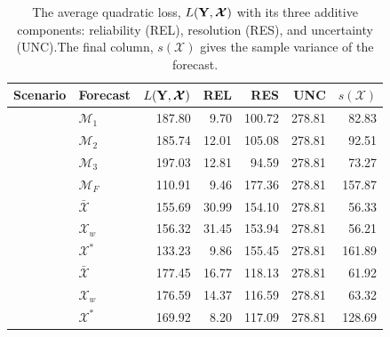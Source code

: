 \documentclass[11pt]{article}
\theoremstyle{definition}
\theoremstyle{definition}
\def\Y{{\bf Y}}
\begin{document}
\begin{table}[h!]
\centering
\caption{The average quadratic loss, $L(\Y,\boldsymbol{\mathcal{X}} )$ with its three additive components: reliability (REL), resolution (RES), and uncertainty (UNC).The final column, $s(\boldsymbol{\mathcal{X}} )$ gives the sample variance of the forecast. 
} 
\begin{tabular}{llrrrrr}
  \hline \hline
Scenario &  Forecast & $L(\Y,\boldsymbol{\mathcal{X}} )$ & REL & RES & UNC & $s(\boldsymbol{\mathcal{X}} )$\\ 
  \hline
 &  $\mathcal{M}_1$ & 187.80 & 9.70 & 100.72 & 278.81 & 82.83 \\ 
& $\mathcal{M}_2$  & 185.74 & 12.01 & 105.08 & 278.81 & 92.51 \\ 
  & $\mathcal{M}_3$ & 197.03 & 12.81 & 94.59 & 278.81 & 73.27 \\ 
&$\mathcal{M}_F$  & 110.91 & 9.46 & 177.36 & 278.81 & 157.87 \\ \rule{0pt}{2.9ex} 
\multirow{3}{*}{No Overlap} &  $\bar{\mathcal{X}}$ & 155.69 & 30.99 & 154.10 & 278.81 & 56.33 \\ 
 & $\mathcal{X}_w$ & 156.32 & 31.45 & 153.94 & 278.81 & 56.21 \\ 
  &$\mathcal{X}^*$ & 133.23 & 9.86 & 155.45 & 278.81 & 161.89 \\ \rule{0pt}{2.9ex} 
 \multirow{3}{*}{High Overlap}  & $\bar{\mathcal{X}}$ & 177.45 & 16.77 & 118.13 & 278.81 & 61.92 \\ 
  & $\mathcal{X}_w$ & 176.59 & 14.37 & 116.59 & 278.81 & 63.32 \\ 
 & $\mathcal{X}^*$ & 169.92 & 8.20 & 117.09 & 278.81 & 128.69 \\ 
\hline
\end{tabular}
\label{NoTbl}
\end{table}
\end{document}
